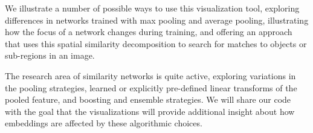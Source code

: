 We illustrate a number of possible ways to use this visualization tool, exploring differences in networks trained with max pooling and average pooling, illustrating how the focus of a network changes during training, and offering an approach that uses this spatial similarity decomposition to search for matches to objects or sub-regions in an image.

The research area of similarity networks is quite active, exploring variations in the pooling strategies, learned or explicitly pre-defined linear transforms of the pooled feature, and boosting and ensemble strategies.  We will share our code with the goal that the visualizations will provide additional insight about how embeddings are affected by these algorithmic choices.
